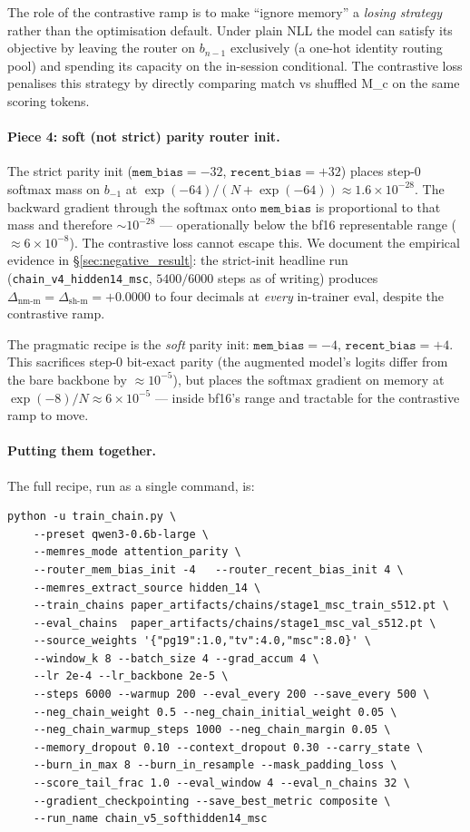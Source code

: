 \documentclass{article}
\newcommand{\dnm}{\Delta_{\text{nm-m}}}
\newcommand{\dsh}{\Delta_{\text{sh-m}}}
\begin{document}
The role of the contrastive ramp is to make ``ignore memory'' a
\emph{losing strategy} rather than the optimisation default. Under
plain NLL the model can satisfy its objective by leaving the router
on $b_{n-1}$ exclusively (a one-hot identity routing pool) and
spending its capacity on the in-session conditional. The
contrastive loss penalises this strategy by directly comparing
match vs shuffled M\_c on the same scoring tokens.

\paragraph{Piece 4: soft (not strict) parity router init.}
The strict parity init ($\texttt{mem\_bias}{=}{-32}$,
$\texttt{recent\_bias}{=}{+32}$) places step-$0$ softmax mass on
$b_{-1}$ at $\exp(-64)/(N\!+\!\exp(-64)) \approx 1.6\!\times\!10^{-28}$.
The backward gradient through the softmax onto $\texttt{mem\_bias}$
is proportional to that mass and therefore $\sim\!10^{-28}$ ---
operationally below the bf16 representable range
($\approx 6\!\times\!10^{-8}$). The contrastive loss cannot escape
this. We document the empirical evidence in
\S\ref{sec:negative_result}: the strict-init headline run
(\texttt{chain\_v4\_hidden14\_msc}, $5400/6000$ steps as of writing)
produces $\dnm{=}\dsh{=}{+0.0000}$ to four decimals at \emph{every}
in-trainer eval, despite the contrastive ramp.

The pragmatic recipe is the \emph{soft} parity init:
$\texttt{mem\_bias}{=}{-4}$, $\texttt{recent\_bias}{=}{+4}$. This
sacrifices step-$0$ bit-exact parity (the augmented model's logits
differ from the bare backbone by $\approx\!10^{-5}$), but places the
softmax gradient on memory at $\exp(-8)/N \approx 6\!\times\!10^{-5}$
--- inside bf16's range and tractable for the contrastive ramp to
move.

\paragraph{Putting them together.} The full recipe, run as a single
command, is:

{\small\begin{verbatim}
python -u train_chain.py \
    --preset qwen3-0.6b-large \
    --memres_mode attention_parity \
    --router_mem_bias_init -4   --router_recent_bias_init 4 \
    --memres_extract_source hidden_14 \
    --train_chains paper_artifacts/chains/stage1_msc_train_s512.pt \
    --eval_chains  paper_artifacts/chains/stage1_msc_val_s512.pt \
    --source_weights '{"pg19":1.0,"tv":4.0,"msc":8.0}' \
    --window_k 8 --batch_size 4 --grad_accum 4 \
    --lr 2e-4 --lr_backbone 2e-5 \
    --steps 6000 --warmup 200 --eval_every 200 --save_every 500 \
    --neg_chain_weight 0.5 --neg_chain_initial_weight 0.05 \
    --neg_chain_warmup_steps 1000 --neg_chain_margin 0.05 \
    --memory_dropout 0.10 --context_dropout 0.30 --carry_state \
    --burn_in_max 8 --burn_in_resample --mask_padding_loss \
    --score_tail_frac 1.0 --eval_window 4 --eval_n_chains 32 \
    --gradient_checkpointing --save_best_metric composite \
    --run_name chain_v5_softhidden14_msc
\end{verbatim}}
\end{document}
